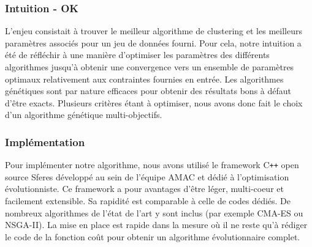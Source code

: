 \documentclass[draft]{llncs}
\begin{document}






\subsubsection{Intuition - OK}

L'enjeu consistait à trouver le meilleur algorithme de clustering et les meilleurs paramètres associés pour un jeu de données fourni.
Pour cela, notre intuition a été de réfléchir à une manière d'optimiser les paramètres des différents algorithmes jusqu'à obtenir une convergence vers un ensemble de paramètres optimaux relativement aux contraintes fournies en entrée.
Les algorithmes génétiques sont par nature efficaces pour obtenir des résultats bons à défaut d'être exacts.
Plusieurs critères étant à optimiser, nous avons donc fait le choix d'un algorithme génétique multi-objectifs.


\subsubsection{Implémentation}

Pour implémenter notre algorithme, nous avons utilisé le framework C{}\verb!++! open source Sferes \cite{Mouret2010} développé au sein de l'équipe AMAC et dédié à l'optimisation évolutionniste.
Ce framework a pour avantages d'être léger, multi-coeur et facilement extensible.
Sa rapidité est comparable à celle de codes dédiés.
De nombreux algorithmes de l'état de l'art y sont inclus (par exemple CMA-ES ou NSGA-II).
La mise en place est rapide dans la mesure où il ne reste qu'à rédiger le code de la fonction coût pour obtenir un algorithme évolutionnaire complet.
\end{document}
